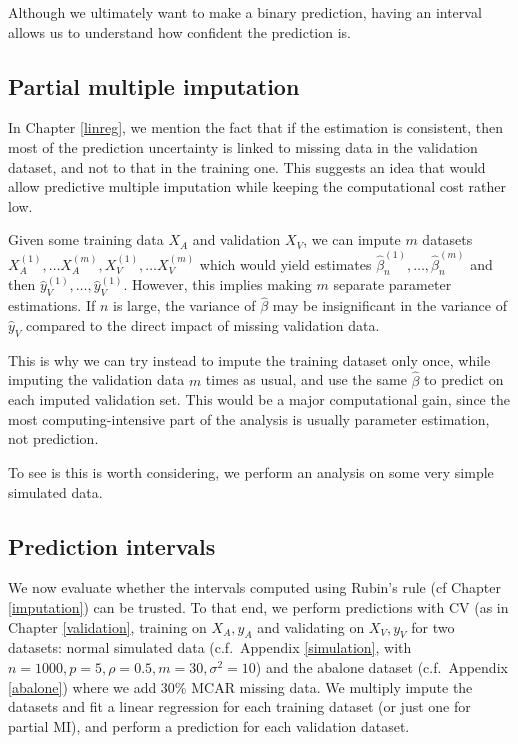 Although we ultimately want to make a binary prediction, having an interval allows us to understand how confident the prediction is.

		\subsection{Partial multiple imputation}
		In Chapter \ref{linreg}, we mention the fact that if the estimation is consistent, then most of the prediction uncertainty is linked to missing data in the validation dataset, and not to that in the training one. This suggests an idea that would allow predictive multiple imputation while keeping the computational cost rather low.
		
		 Given some training data $X_A$ and validation $X_V$, we can impute $m$ datasets $X_A^{(1)}, \ldots X_A^{(m)}, X_V^{(1)}, \ldots X_V^{(m)}$ which would yield estimates $\hat{\beta}_n^{(1)}, \ldots, \hat{\beta}_n^{(m)}$ and then $\hat{y}_V^{(1)}, \ldots, \hat{y}_V^{(1)}$. However, this implies making $m$ separate parameter estimations. If $n$ is large, the variance of $\hat{\beta}$ may be insignificant in the variance of $\hat{y}_V$ compared to the direct impact of missing validation data. 
		 
		 This is why we can try instead to impute the training dataset only once, while imputing the validation data $m$ times as usual, and use the same $\hat{\beta}$ to predict on each imputed validation set. This would be a major computational gain, since the most computing-intensive part of the analysis is usually parameter estimation, not prediction.

To see is this is worth considering, we perform an analysis on some very simple simulated data.

		\subsection{Prediction intervals}
We now evaluate whether the intervals computed using Rubin's rule (cf Chapter \ref{imputation}) can be trusted. To that end, we perform predictions with CV (as in Chapter \ref{validation}, training on $X_A, y_A$ and validating on $X_V, y_V$ for two datasets: normal simulated data (c.f.\ Appendix \ref{simulation}, with $n=1000, p=5, \rho=0.5, m=30, \sigma^2=10$) and the abalone dataset (c.f.\ Appendix \ref{abalone}) where we add 30\% MCAR missing data. We multiply impute the datasets and fit a linear regression for each training dataset (or just one for partial MI), and perform a prediction for each validation dataset.

